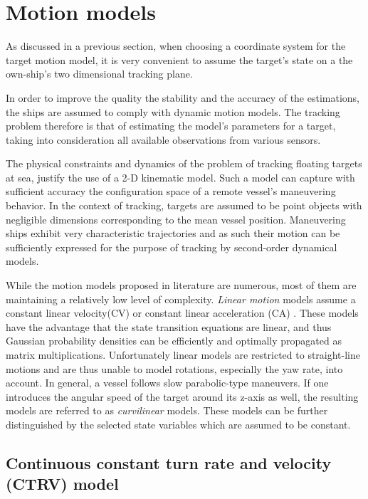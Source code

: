 \section{Motion models}


As discussed in a previous section, when choosing a coordinate system for the target motion model, it is very convenient to assume the target's state on a the own-ship's two dimensional tracking plane.



In order to improve the quality the stability and the accuracy of the estimations, the ships are assumed to comply with dynamic motion models. The tracking problem therefore is that of estimating the model's parameters for a target, taking into consideration all available observations from various sensors.


The physical constraints and dynamics of the problem of tracking floating targets at sea, justify the use of a 2-D kinematic model. Such a model can capture with sufficient accuracy the configuration space of a remote vessel's maneuvering behavior. In the context of tracking, targets are assumed to be point objects with negligible dimensions corresponding to the mean vessel position. Maneuvering ships exhibit very characteristic trajectories and as such their  motion can be sufficiently expressed for the purpose of tracking by second-order dynamical models.

While the motion models proposed in literature are numerous, most of them are maintaining a relatively low level of complexity. \emph{Linear motion} models assume a constant linear velocity(CV) or constant linear acceleration (CA) \cite{Schubert2008}. These models have the advantage that the state transition equations are linear, and thus Gaussian probability densities can be efficiently and optimally propagated as matrix multiplications. Unfortunately linear models are restricted to straight-line motions and are thus unable to model rotations, especially the yaw rate, into account. In general, a vessel follows slow parabolic-type maneuvers. If one introduces the angular speed of the target around its z-axis as well, the resulting models are referred to as \emph{curvilinear} models. These models can be further distinguished by the selected state variables which are assumed to be constant.

\subsection{Continuous constant turn rate and velocity (CTRV) model}


